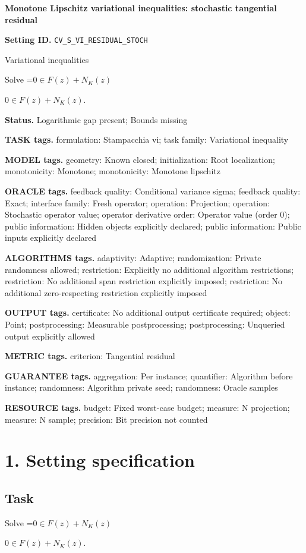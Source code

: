 \documentclass[10pt,a4paper]{article}
\newcommand{\AtlasMath}[1]{\par\begingroup\centering\setbox0=\hbox{$\displaystyle #1$}\ifdim\wd0>1.4\linewidth\typeout{ATLAS WIDE FORMULA: \the\wd0}\fi\ifdim\wd0>\linewidth\resizebox{\linewidth}{!}{\box0}\else\box0\fi\par\endgroup}
\newcommand{\AtlasInlineMath}[1]{\begingroup\setbox0=\hbox{$#1$}\ifdim\wd0>.4\linewidth\endgroup\AtlasMath{#1}\else\endgroup$#1$\fi}
\begin{document}
\raggedright

{\LARGE\bfseries\sffamily\color{AtlasNavy} Monotone Lipschitz variational inequalities: stochastic tangential residual\par}\vspace{5pt}
\textbf{Setting ID.} \texttt{CV\_\allowbreak{}S\_\allowbreak{}VI\_\allowbreak{}RESIDUAL\_\allowbreak{}STOCH}

Variational inequalities

Solve \AtlasInlineMath{0\in F(z)+N_K(z)}.

\textbf{Status.} Logarithmic gap present; Bounds missing

\textbf{TASK tags.} formulation: Stampacchia vi; task family: Variational inequality

\textbf{MODEL tags.} geometry: Known closed; initialization: Root localization; monotonicity: Monotone; monotonicity: Monotone lipschitz

\textbf{ORACLE tags.} feedback quality: Conditional variance sigma; feedback quality: Exact; interface family: Fresh operator; operation: Projection; operation: Stochastic operator value; operator derivative order: Operator value (order 0); public information: Hidden objects explicitly declared; public information: Public inputs explicitly declared

\textbf{ALGORITHMS tags.} adaptivity: Adaptive; randomization: Private randomness allowed; restriction: Explicitly no additional algorithm restrictions; restriction: No additional span restriction explicitly imposed; restriction: No additional zero-respecting restriction explicitly imposed

\textbf{OUTPUT tags.} certificate: No additional output certificate required; object: Point; postprocessing: Measurable postprocessing; postprocessing: Unqueried output explicitly allowed

\textbf{METRIC tags.} criterion: Tangential residual

\textbf{GUARANTEE tags.} aggregation: Per instance; quantifier: Algorithm before instance; randomness: Algorithm private seed; randomness: Oracle samples

\textbf{RESOURCE tags.} budget: Fixed worst-case budget; measure: N projection; measure: N sample; precision: Bit precision not counted

\section{1. Setting specification}
\subsection{Task}
Solve \AtlasInlineMath{0\in F(z)+N_K(z)}.
\end{document}
